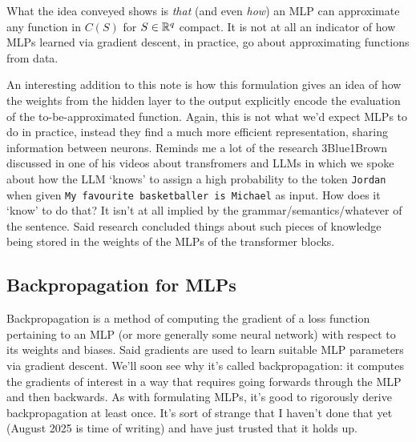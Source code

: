 \documentclass[11pt]{article}
\begin{document}
\begin{tcolorbox}[title={\centering\centering\textbf{Is this idea practical?}}, colback=myLightBlue, colbacktitle=myDarkBlue, colframe=myDarkBlue, coltitle=white]
    What the idea conveyed shows is \textit{that} (and even \textit{how}) an MLP can approximate any function in $C(S)$ for $S\in\mathbb{R}^q$ compact. It is not at all an indicator of how MLPs learned via gradient descent, in practice, go about approximating functions from data.

    \hspace{14pt} An interesting addition to this note is how this formulation gives an idea of how the weights from the hidden layer to the output explicitly encode the evaluation of the to-be-approximated function. Again, this is not what we'd expect MLPs to do in practice, instead they find a much more efficient representation, sharing information between neurons. Reminds me a lot of the research 3Blue1Brown discussed in one of his videos about transfromers and LLMs in which we spoke about how the LLM `knows' to assign a high probability to the token \texttt{Jordan} when given \texttt{My favourite basketballer is Michael} as input. How does it `know' to do that? It isn't at all implied by the grammar/semantics/whatever of the sentence. Said research concluded things about such pieces of knowledge being stored in the weights of the MLPs of the transformer blocks.
\end{tcolorbox}

\subsection{Backpropagation for MLPs}
\label{subsec:backprop}

Backpropagation is a method of computing the gradient of a loss function pertaining to an MLP (or more generally some neural network) with respect to its weights and biases. Said gradients are used to learn suitable MLP parameters via gradient descent. We'll soon see why it's called backpropagation: it computes the gradients of interest in a way that requires going forwards through the MLP and then backwards. As with formulating MLPs, it's good to rigorously derive backpropagation at least once. It's sort of strange that I haven't done that yet (August 2025 is time of writing) and have just trusted that it holds up.
\end{document}
